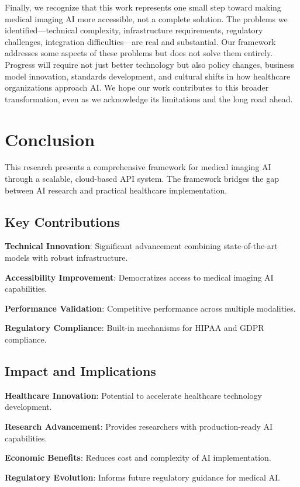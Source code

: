 \documentclass[12pt,a4paper]{article}
\begin{document}
Finally, we recognize that this work represents one small step toward making medical imaging AI more accessible, not a complete solution. The problems we identified—technical complexity, infrastructure requirements, regulatory challenges, integration difficulties—are real and substantial. Our framework addresses some aspects of these problems but does not solve them entirely. Progress will require not just better technology but also policy changes, business model innovation, standards development, and cultural shifts in how healthcare organizations approach AI. We hope our work contributes to this broader transformation, even as we acknowledge its limitations and the long road ahead.

\section{Conclusion}

This research presents a comprehensive framework for medical imaging AI through a scalable, cloud-based API system. The framework bridges the gap between AI research and practical healthcare implementation.

\subsection{Key Contributions}

\textbf{Technical Innovation}: Significant advancement combining state-of-the-art models with robust infrastructure.

\textbf{Accessibility Improvement}: Democratizes access to medical imaging AI capabilities.

\textbf{Performance Validation}: Competitive performance across multiple modalities.

\textbf{Regulatory Compliance}: Built-in mechanisms for HIPAA and GDPR compliance.

\subsection{Impact and Implications}

\textbf{Healthcare Innovation}: Potential to accelerate healthcare technology development.

\textbf{Research Advancement}: Provides researchers with production-ready AI capabilities.

\textbf{Economic Benefits}: Reduces cost and complexity of AI implementation.

\textbf{Regulatory Evolution}: Informs future regulatory guidance for medical AI.
\end{document}
